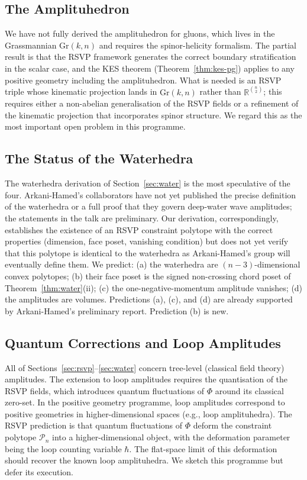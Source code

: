 \documentclass[12pt, oneside]{amsart}
\theoremstyle{plain}
\theoremstyle{definition}
\theoremstyle{remark}
\newcommand{\R}{\mathbb{R}}
\newcommand{\Gr}{\mathrm{Gr}}
\begin{document}
\subsection{The Amplituhedron}

We have not fully derived the amplituhedron for gluons, which lives in the Grassmannian $\Gr(k,n)$ and requires the spinor-helicity formalism. The partial result is that the RSVP framework generates the correct boundary stratification in the scalar case, and the KES theorem (Theorem~\ref{thm:kes-pg}) applies to any positive geometry including the amplituhedron. What is needed is an RSVP triple whose kinematic projection lands in $\Gr(k,n)$ rather than $\R^{\binom{n}{2}}$; this requires either a non-abelian generalisation of the RSVP fields or a refinement of the kinematic projection that incorporates spinor structure. We regard this as the most important open problem in this programme.

\subsection{The Status of the Waterhedra}

The waterhedra derivation of Section~\ref{sec:water} is the most speculative of the four. Arkani-Hamed's collaborators have not yet published the precise definition of the waterhedra or a full proof that they govern deep-water wave amplitudes; the statements in the talk are preliminary. Our derivation, correspondingly, establishes the existence of an RSVP constraint polytope with the correct properties (dimension, face poset, vanishing condition) but does not yet verify that this polytope is identical to the waterhedra as Arkani-Hamed's group will eventually define them. We predict: (a) the waterhedra are $(n-3)$-dimensional convex polytopes; (b) their face poset is the signed non-crossing chord poset of Theorem~\ref{thm:water}(ii); (c) the one-negative-momentum amplitude vanishes; (d) the amplitudes are volumes. Predictions (a), (c), and (d) are already supported by Arkani-Hamed's preliminary report. Prediction (b) is new.

\subsection{Quantum Corrections and Loop Amplitudes}

All of Sections~\ref{sec:rsvp}--\ref{sec:water} concern tree-level (classical field theory) amplitudes. The extension to loop amplitudes requires the quantisation of the RSVP fields, which introduces quantum fluctuations of $\Phi$ around its classical zero-set. In the positive geometry programme, loop amplitudes correspond to positive geometries in higher-dimensional spaces (e.g., loop amplituhedra). The RSVP prediction is that quantum fluctuations of $\Phi$ deform the constraint polytope $\mathcal{P}_n$ into a higher-dimensional object, with the deformation parameter being the loop counting variable $\hbar$. The flat-space limit of this deformation should recover the known loop amplituhedra. We sketch this programme but defer its execution.
\end{document}
